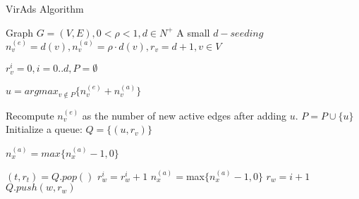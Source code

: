 \begin{algorithm}
	\caption{VirAds Algorithm}
	\begin{algorithmic}[1]
		
		
		\Require Graph $G = (V,E),0<\rho<1,d\in N^{+}$
		\Ensure A small $d-seeding$ 
		\State $n_{v}^{(e)} = d(v),n_{v}^{(a)} = \rho \cdot d(v), r_{v}  = d + 1, v \in V $
		
		\State $r_{v}^{i}=0, i=0..d, P  = \emptyset $
		
		
		\Repeat
		\State $u  = argmax_{v\not\in P}\{n_{v}^{(e)}+n_{v}^{(a)}\}$ 
		
		Recompute $n_{v}^{(e)}$ as the number of new active edges after adding $u$.
		\State $P  = P \cup \{u\} $
		\State Initialize a queue: $Q  = \{(u,r_{v})\} $
		
		\State $n_{x}^{(a)}  = max\{n_{x}^{(a)}-1,0\} $
		
		\EndFor
		\State$(t,r_{t})  = Q.pop() $
		\State $r_{w}^{i}=r_{w}^{i}+1 $
		\State $n_{x}^{(a)} =$max$\{n_{x}^{(a)}-1,0\} $	
		\EndFor
		\State $r_{w}=i+1 $
		\State $Q.push(w,r_{w}) $	
		\EndIf
		\EndIf
		\EndFor
		\EndFor
		\EndWhile
		\EndWhile
	\end{algorithmic}
\end{algorithm}
